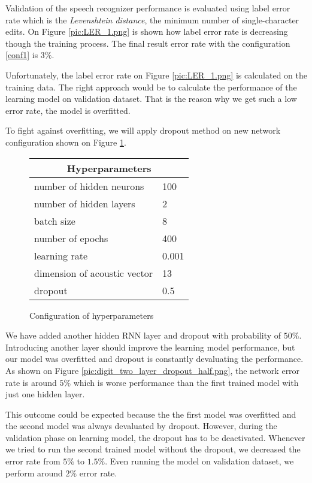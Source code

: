 Validation of the speech recognizer performance is evaluated using label error rate which is the \textit{Levenshtein distance}, the minimum number of single-character edits.
On Figure \ref{pic:LER_1.png} is shown how label error rate is decreasing though the training process.
The final result error rate with the configuration \ref{conf1} is $3\%$.


Unfortunately, the label error rate on Figure \ref{pic:LER_1.png} is calculated on the training data.
The right approach would be to calculate the performance of the learning model on validation dataset.
That is the reason why we get such a low error rate, the model is overfitted.

To fight against overfitting, we will apply dropout method on new network configuration shown on Figure \ref{conf2}.
\begin{figure}
	\centering
	\begin{tabular}{ |l|l| }
  	\hline
  	\multicolumn{2}{|c|}{Hyperparameters} \\
  	\hline
  	number of hidden neurons & 100 \\
  	number of hidden layers & 2 \\
  	batch size & 8 \\
  	number of epochs & 400 \\
  	learning rate & 0.001 \\
  	dimension of acoustic vector & 13 \\
  	dropout & 0.5 \\
  	\hline
	\end{tabular}
	\caption{Configuration of hyperparameters} \label{conf2}
\end{figure}
We have added another hidden RNN layer and dropout with probability of $50\%$.
Introducing another layer should improve the learning model performance, but our model was overfitted and dropout is constantly devaluating the performance.
As shown on Figure \ref{pic:digit_two_layer_dropout_half.png}, the network error rate is around $5\%$ which is worse performance than the first trained model with just one hidden layer.

This outcome could be expected because the the first model was overfitted and the second model was always devaluated by dropout.
However, during the validation phase on learning model, the dropout has to be deactivated.
Whenever we tried to run the second trained model without the dropout, we decreased the error rate from $5\%$ to $1.5\%$.
Even running the model on validation dataset, we perform around $2\%$ error rate.

